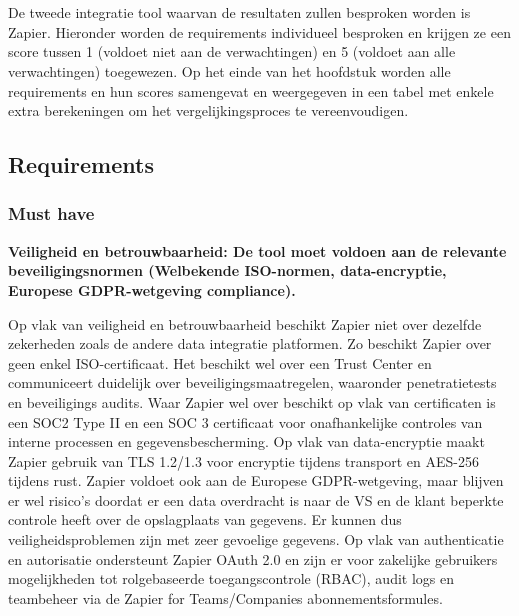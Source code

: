 \chapter{}
\label{ch:Zapier}

De tweede integratie tool waarvan de resultaten zullen besproken worden is Zapier. Hieronder worden de requirements individueel besproken en krijgen ze een score tussen 1 (voldoet niet aan de verwachtingen) en 5 (voldoet aan alle verwachtingen) toegewezen. Op het einde van het hoofdstuk worden alle requirements en hun scores samengevat en weergegeven in een tabel met enkele extra berekeningen om het vergelijkingsproces te vereenvoudigen.

\section{Requirements}%
\label{RequirementsZapier}

\subsection{Must have}%
\label{MustHaveZapier}

\textbf{Veiligheid en betrouwbaarheid: De tool moet voldoen aan de relevante beveiligingsnormen (Welbekende ISO-normen, data-encryptie, Europese GDPR-wetgeving compliance).}

\vspace{\baselineskip}

Op vlak van veiligheid en betrouwbaarheid beschikt Zapier niet over dezelfde zekerheden zoals de andere data integratie platformen. Zo beschikt Zapier over geen enkel ISO-certificaat. Het beschikt wel over een Trust Center en communiceert duidelijk over beveiligingsmaatregelen, waaronder penetratietests en beveiligings audits. Waar Zapier wel over beschikt op vlak van certificaten is een SOC2 Type II en een SOC 3 certificaat voor onafhankelijke controles van interne processen en gegevensbescherming. Op vlak van data-encryptie maakt Zapier gebruik van TLS 1.2/1.3 voor encryptie tijdens transport en AES-256 tijdens rust. Zapier voldoet ook aan de Europese GDPR-wetgeving, maar blijven er wel risico’s doordat er een data overdracht is naar de VS en de klant beperkte controle heeft over de opslagplaats van gegevens. Er kunnen dus veiligheidsproblemen zijn met zeer gevoelige gegevens. Op vlak van authenticatie en autorisatie ondersteunt Zapier OAuth 2.0 en zijn er voor zakelijke gebruikers mogelijkheden tot rolgebaseerde toegangscontrole (RBAC), audit logs en teambeheer via de Zapier for Teams/Companies abonnementsformules. 


